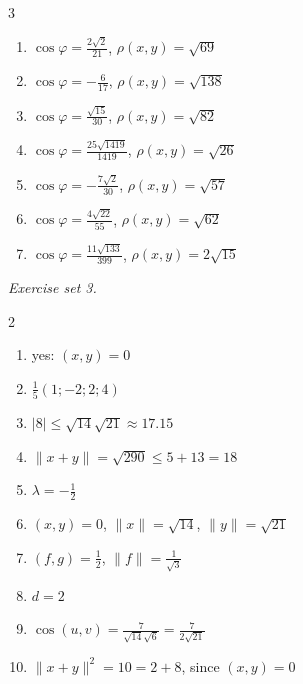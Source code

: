 \begin{multicols}{3}
\begin{enumerate}[label=\arabic*., leftmargin=*, itemsep=1pt]
\item $\cos\varphi=\frac{2 \sqrt{2}}{21}$, $\rho(x,y)=\sqrt{69}$
\item $\cos\varphi=- \frac{6}{17}$, $\rho(x,y)=\sqrt{138}$
\item $\cos\varphi=\frac{\sqrt{15}}{30}$, $\rho(x,y)=\sqrt{82}$
\item $\cos\varphi=\frac{25 \sqrt{1419}}{1419}$, $\rho(x,y)=\sqrt{26}$
\item $\cos\varphi=- \frac{7 \sqrt{2}}{30}$, $\rho(x,y)=\sqrt{57}$
\item $\cos\varphi=\frac{4 \sqrt{22}}{55}$, $\rho(x,y)=\sqrt{62}$
\item $\cos\varphi=\frac{11 \sqrt{133}}{399}$, $\rho(x,y)=2 \sqrt{15}$
\end{enumerate}
\end{multicols}
\par\noindent\emph{Exercise set 3.}\nopagebreak
\begin{multicols}{2}\raggedright
\begin{enumerate}[label=\arabic*., leftmargin=*, itemsep=1pt]
\item yes: $(x,y)=0$
\item $\frac15(1;-2;2;4)$
\item $|8|\le\sqrt{14}\sqrt{21}\approx17.15$
\item $\|x+y\|=\sqrt{290}\le 5+13=18$
\item $\lambda=-\frac{1}{2}$
\item $(x,y)=0$, $\|x\|=\sqrt{14}$, $\|y\|=\sqrt{21}$
\item $(f,g)=\frac12$, $\|f\|=\frac{1}{\sqrt3}$
\item $d=2$
\item $\cos(u,v)=\frac{7}{\sqrt{14}\sqrt6}=\frac{7}{2\sqrt{21}}$
\item $\|x+y\|^2=10=2+8$, since $(x,y)=0$
\end{enumerate}
\end{multicols}
